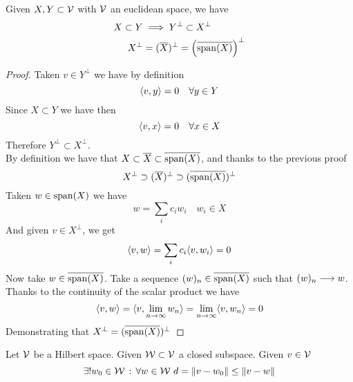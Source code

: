\documentclass[../complete.tex]{subfiles}
\begin{document}
\begin{thm}
	Given $X,Y\subset\mathcal{V}$ with $\mathcal{V}$ an euclidean space, we have
	\begin{equation*}
		\begin{aligned}
			X\subset Y&\implies Y^\perp\subset X^\perp\\
			X^\perp&=(\overline{X})^\perp=\left( \overline{\mathrm{span}(X)} \right)^\perp
		\end{aligned}
	\end{equation*}
\end{thm}
\begin{proof}
	Taken $v\in Y^\perp$ we have by definition
	\begin{equation*}
		\langle v, y \rangle=0\quad\forall y\in Y
	\end{equation*}
	Since $X\subset Y$ we have then
	\begin{equation*}
		\langle v, x \rangle=0\quad\forall x\in X
	\end{equation*}
	Therefore $Y^\perp\subset X^\perp$.\\
	By definition we have that $X\subset\overline{X}\subset\overline{\mathrm{span}(X)}$, and thanks to the previous proof
	\begin{equation*}
		X^\perp\supset (\overline{X})^\perp\supset(\overline{\mathrm{span}(X)})^\perp
	\end{equation*}
	Taken $w\in\mathrm{span}(X)$ we have
	\begin{equation*}
		w=\sum_ic_iw_i\quad w_i\in X
	\end{equation*}
	And given $v\in X^\perp$, we get
	\begin{equation*}
		\langle v, w \rangle=\sum_ic_i\langle v, w_i \rangle=0
	\end{equation*}
	Now take $w\in\overline{\mathrm{span}(X)}$. Take a sequence $(w)_n\in\overline{\mathrm{span}(X)}$ such that $(w)_n\overset{}{\longrightarrow} w$. Thanks to the continuity of the scalar product we have
	\begin{equation*}
		\langle v, w \rangle=\langle v, \lim_{n\to\infty}w_n \rangle=\lim_{n\to\infty}\langle v, w_n \rangle=0
	\end{equation*}
	Demonstrating that $X^\perp=(\overline{\mathrm{span}(X)})^\perp$
\end{proof}
\begin{lem}
	Let $\mathcal{V}$ be a Hilbert space. Given $\mathcal{W}\subset\mathcal{V}$ a closed subspace. Given $v\in\mathcal{V}$
	\begin{equation*}
		\exists!w_0\in\W\st\forall w\in\W\ d=\norm{v-w_0}\le\norm{v-w}
	\end{equation*}
\end{lem}
\end{document}
